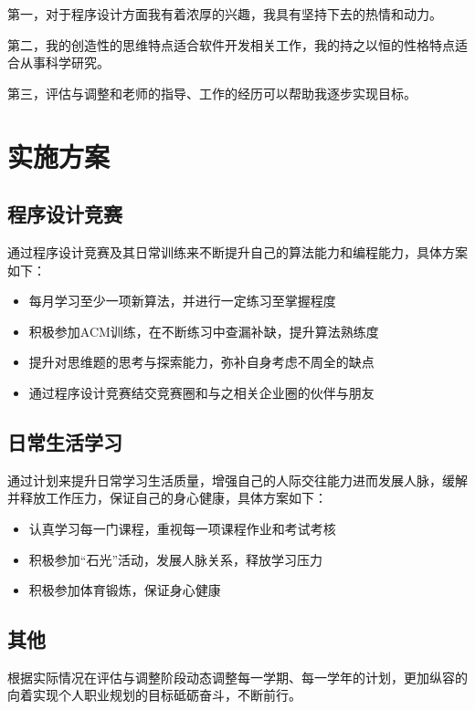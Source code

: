 \documentclass{article}
\begin{document}
第一，对于程序设计方面我有着浓厚的兴趣，我具有坚持下去的热情和动力。

第二，我的创造性的思维特点适合软件开发相关工作，我的持之以恒的性格特点适合从事科学研究。

第三，评估与调整和老师的指导、工作的经历可以帮助我逐步实现目标。

\section{实施方案}

\subsection{程序设计竞赛}

通过程序设计竞赛及其日常训练来不断提升自己的算法能力和编程能力，具体方案如下：

\begin{itemize}
    \item 每月学习至少一项新算法，并进行一定练习至掌握程度
    \item 积极参加ACM训练，在不断练习中查漏补缺，提升算法熟练度
    \item 提升对思维题的思考与探索能力，弥补自身考虑不周全的缺点
    \item 通过程序设计竞赛结交竞赛圈和与之相关企业圈的伙伴与朋友
\end{itemize}

\subsection{日常生活学习}

通过计划来提升日常学习生活质量，增强自己的人际交往能力进而发展人脉，缓解并释放工作压力，保证自己的身心健康，具体方案如下：

\begin{itemize}
    \item 认真学习每一门课程，重视每一项课程作业和考试考核
    \item 积极参加“石光”活动，发展人脉关系，释放学习压力
    \item 积极参加体育锻炼，保证身心健康
\end{itemize}

\subsection{其他}

根据实际情况在评估与调整阶段动态调整每一学期、每一学年的计划，更加纵容的向着实现个人职业规划的目标砥砺奋斗，不断前行。
\end{document}

